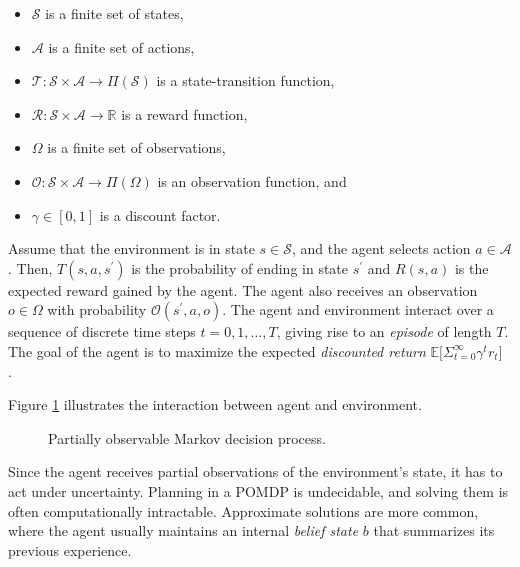 \begin{itemize}
    \item \(\mathcal{S}\) is a finite set of states,
    \item \(\mathcal{A}\) is a finite set of actions,
    \item \(\mathcal{T}: \mathcal{S} \times \mathcal{A} \rightarrow \Pi(\mathcal{S})\) is a state-transition function,
    \item \(\mathcal{R}: \mathcal{S} \times \mathcal{A} \rightarrow \mathbb{R}\) is a reward function,
    \item \(\Omega\) is a finite set of observations,
    \item \(\mathcal{O}: \mathcal{S} \times \mathcal{A} \rightarrow \Pi(\Omega)\) is an observation function, and
    \item \(\gamma \in [0, 1]\) is a discount factor.
\end{itemize}

Assume that the environment is in state \(s \in \mathcal{S}\), and the agent selects action \(a \in \mathcal{A}\).
Then, \(T(s, a, s^\prime)\) is the probability of ending in state \(s^\prime\) and \(R(s, a)\) is the expected reward gained by the agent.
The agent also receives an observation \(o \in \Omega\) with probability \(\mathcal{O}(s^\prime, a, o)\).
The agent and environment interact over a sequence of discrete time steps \(t = 0, 1, \dots, T\), giving rise to an \textit{episode} of length \(T\).
The goal of the agent is to maximize the expected \textit{discounted return} \(\mathbb{E} \lbrack \Sigma_{t=0}^\infty \gamma^t r_t \rbrack\).~\cite{kaelbling_pomdp_1998}

Figure \ref{fig:pomdp} illustrates the interaction between agent and environment.

\begin{figure}
    \centering
    
    \label{fig:pomdp}
    \caption[Partially observable Markov decision process]{Partially observable Markov decision process.}
\end{figure}

Since the agent receives partial observations of the environment's state, it has to act under uncertainty.
Planning in a POMDP is undecidable, and solving them is often computationally intractable.
Approximate solutions are more common, where the agent usually maintains an internal \textit{belief state} \(b\) that summarizes its previous experience.


